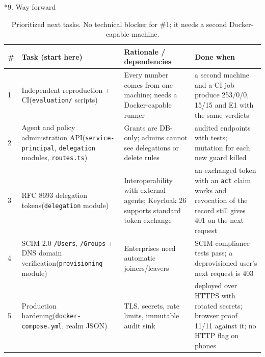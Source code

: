 \documentclass[11pt]{article}
\makeatletter
\newcommand{\code}[1]{\texttt{\small #1}}
\renewcommand\section{\@startsection{section}{1}{0pt}{-10pt plus -2pt}{4pt}{\large\bfseries}}
\makeatother
\begin{document}
\section*{9. Way forward}
\begin{table}[H]
\centering\small
\begin{tabularx}{\textwidth}{@{}P{0.3cm} P{3.9cm} L P{4.1cm}@{}}
\toprule
\textbf{\#} & \textbf{Task (start here)} & \textbf{Rationale / dependencies} & \textbf{Done when}\\
 & Independent reproduction + CI\newline(\code{evaluation/} scripts) & Every number comes from one machine; needs a Docker-capable runner & a second machine and a CI job produce 253/0/0, 15/15 and E1 with the same verdicts\\
2 & Agent and policy administration API\newline(\code{service-principal}, \code{delegation} modules, \code{routes.ts}) & Grants are DB-only; admins cannot see delegations or delete rules & audited endpoints with tests; mutation for each new guard killed\\
3 & RFC 8693 delegation tokens\newline(\code{delegation} module) & Interoperability with external agents; Keycloak 26 supports standard token exchange & an exchanged token with an \code{act} claim works and revocation of the record still gives 401 on the next request\\
4 & SCIM 2.0 \code{/Users}, \code{/Groups} + DNS domain verification\newline(\code{provisioning} module) & Enterprises need automatic joiners/leavers & SCIM compliance tests pass; a deprovisioned user's next request is 403\\
5 & Production hardening\newline(\code{docker-compose.yml}, realm JSON) & TLS, secrets, rate limits, immutable audit sink & deployed over HTTPS with rotated secrets; browser proof 11/11 against it; no HTTP flag on phones\\
\bottomrule
\end{tabularx}
\caption{Prioritized next tasks. No technical blocker for \#1; it needs a second Docker-capable machine.}
\end{table}

\end{document}
